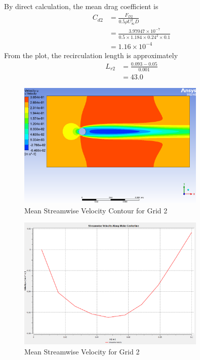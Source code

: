 By direct calculation, the mean drag coefficient is
\begin{align*}
    C_{d2} &= \frac{F_{D2}}{0.5\rho U_\infty^2 D} \\
    &= \frac{3.97047 \times 10^{-7}}{0.5 \times 1.184 \times 0.24^2 \times 0.1} \\
    &= 1.16 \times 10^{-4}
\end{align*}
From the plot, the recirculation length is approximately
\begin{align*}
    L_{r2} &= \frac{0.093 - 0.05}{0.001} \\
    &=\boxed{43.0}
\end{align*}
\begin{figure}[H]
    \centering
    \includegraphics[width=0.8\textwidth]{Questions/Figures/u velocity contour grid 2.png}
    \caption{Mean Streamwise Velocity Contour for Grid 2}
\end{figure}
\begin{figure}[H]
    \centering
    \includegraphics[width=0.8\textwidth]{Questions/Figures/plot with grid 2.png}
    \caption{Mean Streamwise Velocity for Grid 2}
\end{figure}
